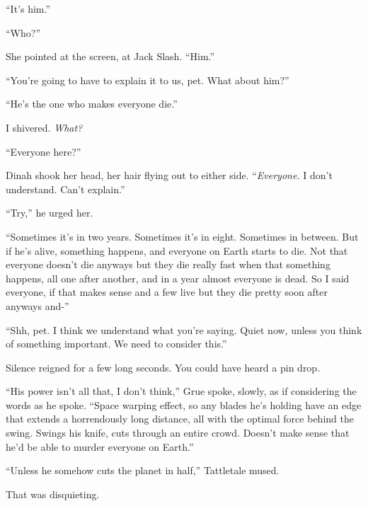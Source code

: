 ``It's him.''



``Who?''



She pointed at the screen, at Jack Slash.  ``Him.''



``You're going to have to explain it to us, pet.  What about him?''



``He's the one who makes everyone die.''



I shivered.  \emph{What?}



``Everyone here?''



Dinah shook her head, her hair flying out to either side.  ``\emph{Everyone.}  I don't understand.  Can't explain.''



``Try,'' he urged her.



``Sometimes it's in two years.  Sometimes it's in eight.  Sometimes in between.  But if he's alive, something happens, and everyone on Earth starts to die.  Not that everyone doesn't die anyways but they die really fast when that something happens, all one after another, and in a year almost everyone is dead.  So I said everyone, if that makes sense and a few live but they die pretty soon after anyways and-''



``Shh, pet.  I think we understand what you're saying.  Quiet now, unless you think of something important.  We need to consider this.''



Silence reigned for a few long seconds.  You could have heard a pin drop.



``His power isn't all that, I don't think,'' Grue spoke, slowly, as if considering the words as he spoke.  ``Space warping effect, so any blades he's holding have an edge that extends a horrendously long distance, all with the optimal force behind the swing.  Swings his knife, cuts through an entire crowd.  Doesn't make sense that he'd be able to murder everyone on Earth.''



``Unless he somehow cuts the planet in half,'' Tattletale mused.



That was disquieting.



